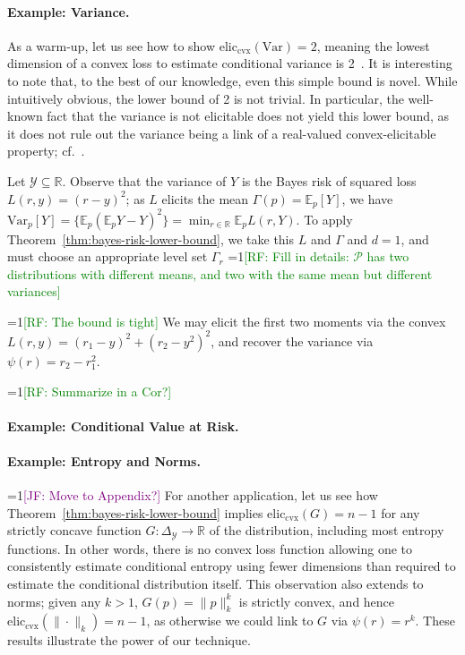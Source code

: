 \documentclass[anon,12pt]{colt2021} %
\newcommand{\Comments}{1}
\newcommand{\mynote}[2]{\ifnum\Comments=1\textcolor{#1}{#2}\fi}
\newcommand{\raf}[1]{\mynote{green}{[RF: #1]}}
\newcommand{\jessie}[1]{\mynote{purple}{[JF: #1]}}
\newcommand{\reals}{\mathbb{R}}
\newcommand{\simplex}{\Delta_\Y}
\newcommand{\eliccvx}{\mathrm{elic}_\mathrm{cvx}}
\newcommand{\E}{\mathbb{E}}
\renewcommand{\P}{\mathcal{P}}
\newcommand{\Y}{\mathcal{Y}}
\newcommand{\Var}{\mathrm{Var}}
\begin{document}
\paragraph{Example: Variance.}
As a warm-up, let us see how to show $\eliccvx(\Var)=2$, meaning the lowest dimension of a convex loss to estimate conditional variance is 2~\citep{osband1985providing,lambert2018elicitation}.
It is interesting to note that, to the best of our knowledge, even this simple bound is novel.
While intuitively obvious, the lower bound of 2 is not trivial.
In particular, the well-known fact that the variance is not elicitable does not yield this lower bound, as it does not rule out the variance being a link of a real-valued convex-elicitable property; cf.~\citet[Remark 1]{frongillo2018elicitation}.

Let $\Y\subseteq\reals$.
Observe that the variance of $Y$ is the Bayes risk of squared loss $L(r,y) = (r-y)^2$; as $L$ elicits the mean $\Gamma(p) = \E_p [Y]$, we have $\Var_p[Y] = \{\E_p (\E_pY - Y)^2 \} = \min_{r\in\reals} \E_p L(r,Y)$.
To apply Theorem~\ref{thm:bayes-risk-lower-bound}, we take this $L$ and $\Gamma$ and $d=1$, and must choose an appropriate level set $\Gamma_r$
\raf{Fill in details: $\P$ has two distributions with different means, and two with the same mean but different variances}

\raf{The bound is tight}
We may elicit the first two moments via the convex $L(r,y) = (r_1-y)^2 + (r_2-y^2)^2$, and recover the variance via $\psi(r) = r_2-r_1^2$.

\raf{Summarize in a Cor?}

\paragraph{Example: Conditional Value at Risk.}




\paragraph{Example: Entropy and Norms.}
\jessie{Move to Appendix?}
For another application, let us see how Theorem~\ref{thm:bayes-risk-lower-bound} implies $\eliccvx(G) = n-1$ for any strictly concave function $G:\simplex\to\reals$ of the distribution, including most entropy functions.
In other words, there is no convex loss function allowing one to consistently estimate conditional entropy using fewer dimensions than required to estimate the conditional distribution itself.
This observation also extends to norms; given any $k>1$, $G(p) = \|p\|_k^k$ is strictly convex, and hence $\eliccvx(\|\cdot\|_k) = n-1$, as otherwise we could link to $G$ via $\psi(r) = r^k$.
These results illustrate the power of our technique.
\end{document}
